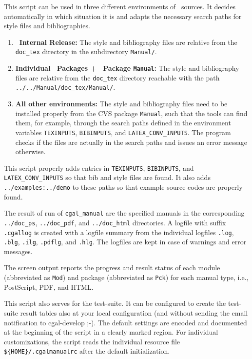  This script can be used in three different environments of \cgal\ sources.
 It decides automatically in which situation it is and adapts the necessary
 search paths for style files and bibliographies.

\begin{enumerate} 
  \item \textbf{\cgal\ Internal Release:}
     The style and bibliography files are relative from the
     \texttt{doc\_tex} directory  in the subdirectory
     \texttt{Manual/}.
 
  \item \textbf{Individual \cgal\ Packages + \cgal\ Package \texttt{Manual}:}
     The style and bibliography files are  relative from the
     \texttt{doc\_tex} directory reachable with the path
     \texttt{../../Manual/doc\_tex/Manual/}.

   \item \textbf{All other environments:}
     The style and bibliography files need to be installed properly
     from the CVS package \texttt{Manual}, such that the tools can
     find them, for example, through the search paths defined in the
     environment variables  \texttt{TEXINPUTS}, \texttt{BIBINPUTS},
     and \texttt{LATEX\_CONV\_INPUTS}. The program checks if the files
     are actually in the search paths and issues an error message otherwise.
\end{enumerate}
 
This script properly adds entries in \texttt{TEXINPUTS},
\texttt{BIBINPUTS}, and \texttt{LATEX\_CONV\_INPUTS} so that bib and
style files are found. It also adds \texttt{../examples:../demo} to
these paths so that example source codes are properly found.

The result of run of \texttt{cgal\_manual} are the specified manuals
in the corresponding \texttt{../doc\_ps}, \texttt{../doc\_pdf}, and
\texttt{../doc\_html} directories. A logfile with suffix
\texttt{.cgallog} is created with a logfile summary from the
individual logfiles \texttt{.log}, \texttt{.blg}, \texttt{.ilg},
\texttt{.pdflg}, and \texttt{.hlg}. The logfiles are kept in case of
warnings and error messages. 

The screen output reports the progress and result status of each
module (abbreviated as \texttt{Mod}) and package (abbreviated as
\texttt{Pck}) for each manual type, i.e., PostScript, PDF, and HTML.

This script also serves for the test-suite. It can be configured to
create the test-suite result tables also at your local configuration
(and without sending the email notification to cgal-develop ;-).
The default settings are encoded and documented at the beginning of
the script in a clearly marked region. For individual customizations,
the script reads the individual resource file
\verb|${HOME}/.cgalmanualrc| after the default initialization.


